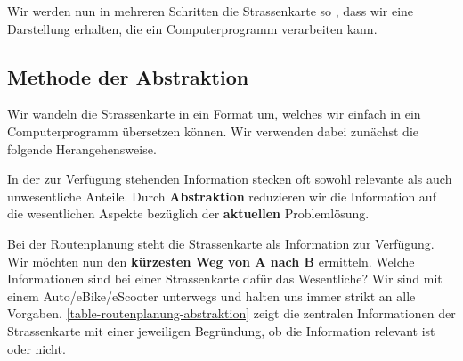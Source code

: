 Wir werden nun in mehreren Schritten die Strassenkarte so , dass wir eine Darstellung erhalten, die ein Computerprogramm verarbeiten kann.	

\subsection{Methode der Abstraktion}

Wir wandeln die Strassenkarte in ein Format um, welches wir einfach in ein Computerprogramm übersetzen können. Wir verwenden dabei zunächst die folgende Herangehensweise.

\begin{definition}
In der zur Verfügung stehenden Information stecken oft sowohl relevante als auch unwesentliche Anteile. Durch \textbf{Abstraktion} reduzieren wir die Information auf die wesentlichen Aspekte bezüglich der \textbf{aktuellen} Problemlösung.
\end{definition}

Bei der Routenplanung steht die Strassenkarte als Information zur Verfügung. Wir möchten nun den \textbf{kürzesten Weg von A nach B} ermitteln. Welche Informationen sind bei einer Strassenkarte dafür das Wesentliche? Wir sind mit einem  Auto/eBike/eScooter unterwegs und halten uns immer strikt an alle Vorgaben. \autoref{table-routenplanung-abstraktion} zeigt die zentralen Informationen der Strassenkarte mit einer jeweiligen Begründung, ob die Information relevant ist oder nicht.

